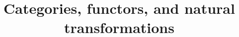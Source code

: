 \documentclass{ximera}
\title{Categories, functors, and natural transformations}
\begin{document}
\begin{abstract}

\end{abstract}
\maketitle

\end{document}
